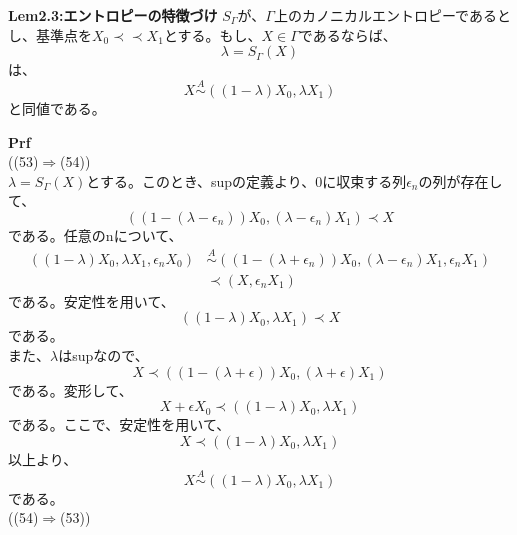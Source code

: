 \documentclass[a4paper,11pt]{jsarticle}
\numberwithin{equation}{section}
\begin{document}
\begin{itembox}[l]{\textbf{Lem2.3:エントロピーの特徴づけ}}
$S_{\Gamma}$が、$\Gamma$上のカノニカルエントロピーであるとし、基準点を$X_0 \prec \prec X_1$とする。もし、$X\in \Gamma$であるならば、
\begin{equation}
    \lambda = S_{\Gamma}(X)
\end{equation}
は、
\begin{equation}
    X \overset{A}{\sim} ((1-\lambda)X_0,\lambda X_1)
\end{equation}
と同値である。\\

\end{itembox}
\textbf{Prf}\\
((53)$\Rightarrow$(54))\\
$\lambda = S_{\Gamma}(X)$とする。このとき、supの定義より、0に収束する列$\epsilon_n$の列が存在して、
\begin{equation}
    ((1-(\lambda-\epsilon_n))X_0,(\lambda-\epsilon_n)X_1) \prec X
\end{equation}
である。任意のnについて、
\begin{align}
    ((1-\lambda)X_0,\lambda X_1,\epsilon_n X_0) &\overset{A}{\sim} ((1-(\lambda+\epsilon_n))X_0,(\lambda-\epsilon_n)X_1,\epsilon_n X_1)\\
    &\prec (X,\epsilon_n X_1)
\end{align}
である。安定性を用いて、
\begin{equation}
    ((1-\lambda)X_0,\lambda X_1) \prec X
\end{equation}
である。\\
また、$\lambda$はsupなので、
\begin{equation}
    X \prec ((1-(\lambda+\epsilon))X_0,(\lambda+\epsilon)X_1)
\end{equation}
である。変形して、
\begin{equation}
    X+\epsilon X_0 \prec ((1-\lambda)X_0,\lambda X_1)
\end{equation}
である。ここで、安定性を用いて、
\begin{equation}
    X \prec ((1-\lambda)X_0,\lambda X_1)
\end{equation}
以上より、
\begin{equation}
    X \overset{A}{\sim} ((1-\lambda)X_0,\lambda X_1)
\end{equation}
である。 \\

((54)$\Rightarrow$(53))\\
\end{document}
